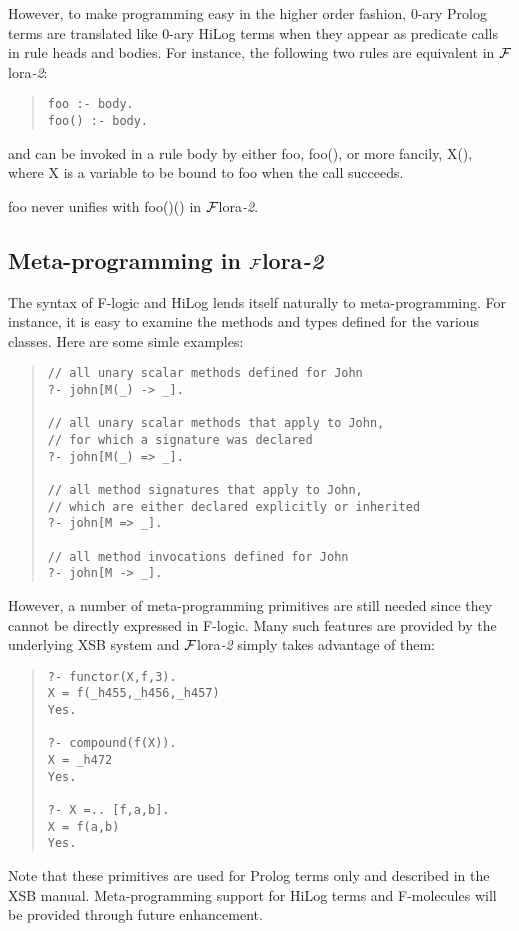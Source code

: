 \documentclass[11pt]{article}
\newcommand{\FLORA}{{\mbox{${\cal F}${\sc lora}\rm\emph{-2}}}\xspace}
\newcommand{\fl}{\mbox{F-logic}\xspace}
\begin{document}
However, to make programming easy in the higher order fashion, 0-ary
Prolog terms are translated like 0-ary HiLog terms when they appear
as predicate calls in rule heads and bodies. For instance, the
following two rules are equivalent in \FLORA:
\begin{quote}
\begin{verbatim}
foo :- body.
foo() :- body.
\end{verbatim}
\end{quote}
and can be invoked in a rule body by either {\sf foo}, {\sf foo()},
or more fancily, {\sf X()}, where {\sf X} is a variable to be bound
to {\sf foo} when the call succeeds.

{\sf foo} never unifies with {\sf foo()()} in \FLORA.


\subsection{Meta-programming in \FLORA}


%
The syntax of \fl and HiLog lends itself naturally to meta-programming. For
instance, it is easy to examine the methods and types defined for the
various classes.  Here are some simle examples:
\begin{quote}
\begin{verbatim}
// all unary scalar methods defined for John
?- john[M(_) -> _].

// all unary scalar methods that apply to John,
// for which a signature was declared
?- john[M(_) => _].

// all method signatures that apply to John,
// which are either declared explicitly or inherited
?- john[M => _].

// all method invocations defined for John
?- john[M -> _].
\end{verbatim}
\end{quote}

However, a number of meta-programming primitives are still needed
since they cannot be directly expressed in \fl. Many such features are
provided by the underlying XSB system and \FLORA simply takes advantage of
them: 
\begin{quote}
\begin{verbatim}
?- functor(X,f,3).
X = f(_h455,_h456,_h457)
Yes.

?- compound(f(X)).
X = _h472
Yes.

?- X =.. [f,a,b].
X = f(a,b)
Yes.
\end{verbatim}
\end{quote}
Note that these primitives are used for Prolog terms only and
described in the XSB manual. Meta-programming support for HiLog terms
and F-molecules will be provided through future enhancement.
\end{document}
